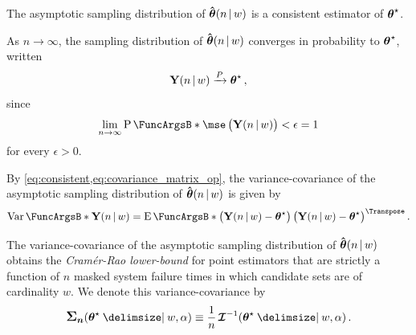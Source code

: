 \documentclass[
    11pt,
    extrafontsizes,
    article,
    oldfontcommands,
    final,
    oneside,
    openany,
    hidelinks]{memoir}
\begin{document}
\fussy
\begin{algorithm}[H]
\DontPrintSemicolon
{}
\BlankLine
{}
\caption{Generative model of the maximum likelihood estimator conditioned on $w$ candidates}
\label{alg:samp_d_gen_model}
\end{algorithm}

The asymptotic sampling distribution of $\boldsymbol{\mathbf{\hat{\boldsymbol{\mathbf{\theta}}}}}(n {\,|\,} w)$ is a consistent estimator of ${\boldsymbol{\mathbf{\theta}}}^{\star}$.
\begin{postulate}
\label{def:consistent}
    As $n \to \infty$, the sampling distribution of $\boldsymbol{\mathbf{\hat{\boldsymbol{\mathbf{\theta}}}}}(n {\,|\,} w)$ converges in probability to ${\boldsymbol{\mathbf{\theta}}}^{\star}$, written
    \begin{equation}
    \label{eq:consistent}
        \mathrm{\boldsymbol{\mathbf{Y}}}(n {\,|\,} w) \xrightarrow{P} {\boldsymbol{\mathbf{\theta}}}^{\star}\,,
    \end{equation}
    since
    \begin{equation}
    \lim_{n \to \infty} \Prob{\mse\left(\sampd\right) < \epsilon} = 1
    \end{equation}
    for every $\epsilon > 0$.
\end{postulate}

By \cref{eq:consistent,eq:covariance_matrix_op}, the variance-covariance of the asymptotic sampling distribution of $\boldsymbol{\mathbf{\hat{\boldsymbol{\mathbf{\theta}}}}}(n {\,|\,} w)$ is given by
\begin{equation}
\label{def:asym_covariance_matrix}
    \Var{\sampd} = \Expect{
        \left(\sampd - \tparam\sysparamvec \right)
        \left(\sampd - \tparam\sysparamvec \right)^{\Transpose}}\,.
\end{equation}

\begin{postulate}
The variance-covariance of the asymptotic sampling distribution of $\boldsymbol{\mathbf{\hat{\boldsymbol{\mathbf{\theta}}}}}(n {\,|\,} w)$ obtains the \emph{Cram\'{e}r-Rao lower-bound} for point estimators that are strictly a function of $n$ masked system failure times in which candidate sets are of cardinality $w$. We denote this variance-covariance by
\begin{equation}
    \cov(\tparam\sysparamvec \Given w, \alpha) \equiv \frac{1}{n} \infomatrx^{-1}(\tparam\sysparamvec\Given w, \alpha)\,.
\end{equation}
\end{postulate}
\end{document}
